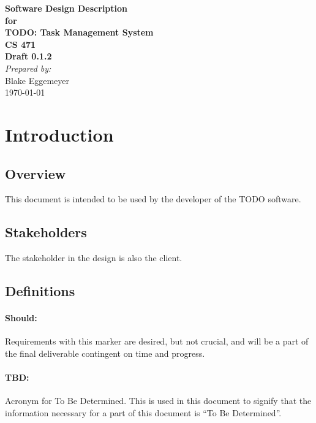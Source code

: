 \documentclass[12pt]{article}
\begin{document}
\begin{titlepage}
\begin{flushright} 
{\LARGE \bfseries Software Design Description}\\[1.2cm]
{\large \bfseries for}\\[1.2cm]
{\huge \bfseries TODO: Task Management System}\\[1.2cm]
{\large \bfseries CS 471}\\
\vfill
{\large \bfseries Draft 0.1.2}\\[2cm]
\emph{Prepared by:} \\
Blake Eggemeyer \\ [3cm]
{\large \today}
\end{flushright}
\end{titlepage}
\setcounter{tocdepth}{3}
\setcounter{secnumdepth}{5}
\tableofcontents
\newpage

\section{Introduction}

\subsection{Overview}
This document is intended to be used by the developer of the TODO software.

\subsection{Stakeholders}
The stakeholder in the design is also the client.

\subsection{Definitions}
\setcounter{paragraph}{0}
\setcounter{subsubsection}{0}
\paragraph{Should:} Requirements with this marker are desired, but not crucial, and will be a part of the final deliverable contingent on time and progress.
\paragraph{TBD:} Acronym for To Be Determined. This is used in this document to signify that the information necessary for a part of this document is ``To Be Determined''.
\end{document}
